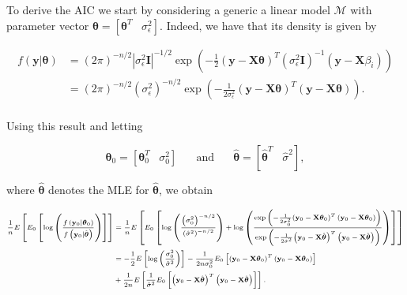 \documentclass[]{book}
\theoremstyle{definition}
\theoremstyle{definition}
\theoremstyle{definition}
\theoremstyle{remark}
\begin{document}
{To derive the AIC we start by considering a generic a linear model
\(\mathcal{M}\) with parameter vector
\(\boldsymbol{\theta} = [\boldsymbol{\theta}^T \;\;\; \sigma_{\epsilon}^2]\).
Indeed, we have that its density is given by

\[\begin{aligned} 
  f\left( {\mathbf{y}|\boldsymbol{\theta} } \right) &= {\left( {2\pi } \right)^{ - n/2}}{\left| { \sigma_{\epsilon}^2 \mathbf{I}} \right|^{ - 1/2}}\exp \left( { - \frac{1}{2}{{\left( {\mathbf{y} - \mathbf{X}{\boldsymbol{\theta}}} \right)}^T}{{\left( {\sigma_{\epsilon}^2 \mathbf{I}} \right)}^{ - 1}}\left( {\mathbf{y} - \mathbf{X}{\beta _i}} \right)} \right)  \\
   &= {\left( {2\pi } \right)^{ - n/2}}{\left( {\sigma_{\epsilon}^2} \right)^{ - n/2}}\exp \left( { - \frac{1}{{2 \sigma_{\epsilon}^2}}{{\left( {\mathbf{y} - \mathbf{X}{\boldsymbol{\theta}}} \right)}^T}\left( {\mathbf{y} - \mathbf{X}{\boldsymbol{\theta}}} \right)} \right).  \\ 
\end{aligned} \]

Using this result and letting

\[{\boldsymbol{\theta}}_0 = [{\boldsymbol{\theta}}_0^T \;\;\; {\sigma}^2_0] \;\;\;\;\; \text{ and }  \;\;\;\;\; \hat{\boldsymbol{\theta}} = [\hat{\boldsymbol{\theta}}^T \;\;\; \hat{\sigma}^2], \]

where \(\hat{\boldsymbol{\theta}}\) denotes the MLE for
\(\hat{\boldsymbol{\theta}}\), we obtain

\[\scriptsize \begin{aligned}
 \frac{1}{n} {E}\left[ {E_0}\left[ {\log \left( {\frac{{f\left( {\mathbf{y}_0|{\boldsymbol{\theta}_0}} \right)}}{{f\left( {\mathbf{y}_0|{\hat{\boldsymbol{\theta}}}} \right)}}} \right)} \right]\right]
   &= \frac{1}{n} {E}\left[ {E_0}\left[ \log \left( {\frac{{{{\left( {\sigma _0^2} \right)}^{ - n/2}}}}{{{{\left( {\hat{\sigma}^2} \right)}^{ - n/2}}}}} \right)  
 + \log \left( \frac{{\exp \left( { - \frac{1}{{2\sigma _0^2}}{{\left( {\mathbf{y}_0 - \mathbf{X}{\boldsymbol{\theta} _0}} \right)}^T}\left( {\mathbf{y}_0 - \mathbf{X}{\boldsymbol{\theta} _0}} \right)} \right)}}{{\exp \left( { - \frac{1}{{2\hat{\sigma}^2}}{{\left( {\mathbf{y}_0 - \mathbf{X}{\hat{\boldsymbol{\theta}}}} \right)}^T}\left( {\mathbf{y}_0 - \mathbf{X}{\hat{\boldsymbol{\theta}}}} \right)} \right)}} \right) \right]  \right] \\
  &= -\frac{1}{2} E \left[\log \left( {\frac{{\sigma _0^2}}{{\hat{\sigma}^2}}} \right)\right] - \frac{1}{{2n\sigma _0^2}}{E_0}\left[ {{{\left( {\mathbf{y}_0 - \mathbf{X}{\boldsymbol{\theta} _0}} \right)}^T}\left( {\mathbf{y}_0 - \mathbf{X}{\boldsymbol{\theta} _0}} \right)} \right] \\
   &+ \frac{1}{{2n}}{E}\left[\frac{1}{\hat{\sigma}^2}E_0\left[ {{{\left( {\mathbf{y}_0 - \mathbf{X}{\hat{\boldsymbol{\theta}}}} \right)}^T}\left( {\mathbf{y}_0 - \mathbf{X}{\hat{\boldsymbol{\theta}}}} \right)} \right]\right].
 \end{aligned} \]

}
\end{document}
